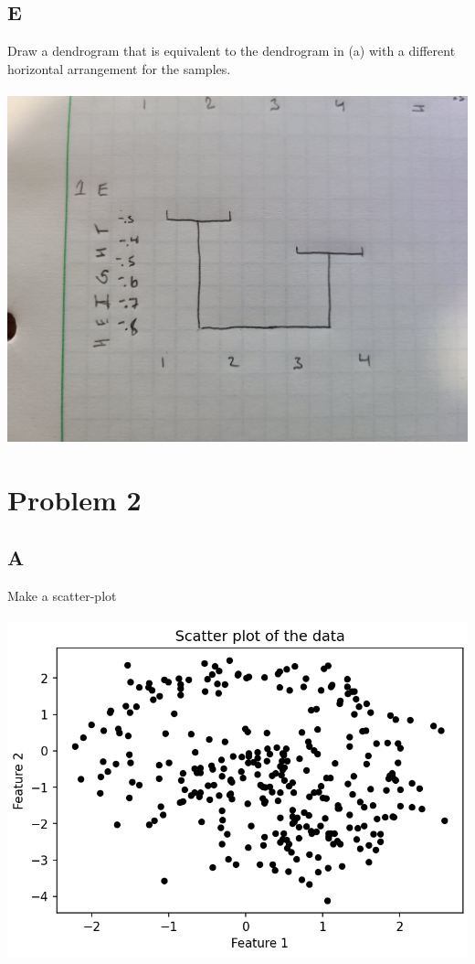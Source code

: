 \documentclass[12pt]{article}
\begin{document}
\subsection{E}
Draw a dendrogram that is equivalent to the dendrogram in (a) with a different horizontal arrangement for the samples.\\\\
\includegraphics[width=1\textwidth]{p1.e.jpg}



\section{Problem 2}
\subsection{A}
Make a scatter-plot\\\\
\includegraphics[width=1\textwidth]{p2.a.png}
\end{document}
